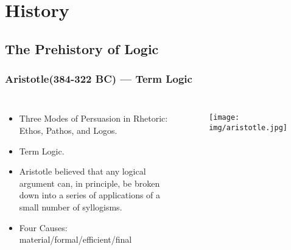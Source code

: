 \documentclass[UTF8,11pt,colorlinks,compress,openany]{beamer}%
\begin{document}
\section{History}


\subsection{The Prehistory of Logic}

\begin{frame}\frametitle{Aristotle(384-322 BC) --- Term Logic}
	\begin{columns}
			\begin{itemize}
				\item Three Modes of Persuasion in Rhetoric: Ethos, Pathos, and Logos.
				\item Term Logic.
				\item Aristotle believed that any logical argument can, in principle, be broken down into a series of applications of a small number of syllogisms.
				\item Four Causes: material/formal/efficient/final
			\end{itemize}
			\begin{figure}
				\texttt{[image: img/aristotle.jpg]}
			\end{figure}
	\end{columns}
\end{frame}
\end{document}
